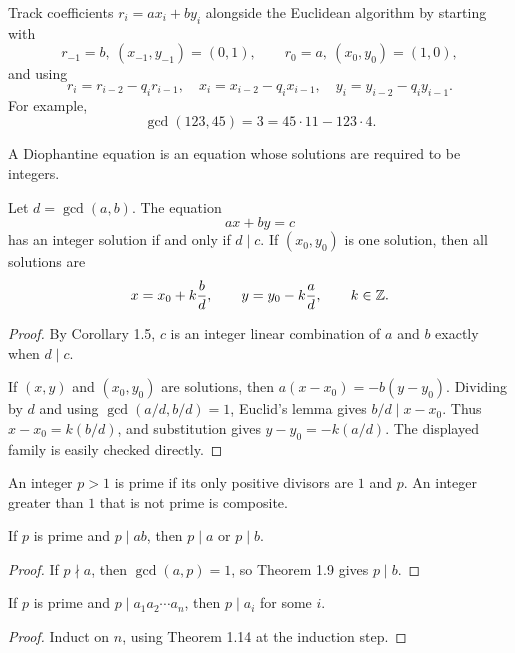 \begin{app}
Track coefficients $r_i=ax_i+by_i$ alongside the Euclidean algorithm by starting with
\[
 r_{-1}=b,\ (x_{-1},y_{-1})=(0,1),\qquad
 r_0=a,\ (x_0,y_0)=(1,0),
\]
and using
\[
 r_i=r_{i-2}-q_i r_{i-1},\quad
 x_i=x_{i-2}-q_i x_{i-1},\quad
 y_i=y_{i-2}-q_i y_{i-1}.
\]
For example,
\[
 \gcd(123,45)=3=45\cdot 11-123\cdot 4.
\]
\end{app}

\begin{de}
A Diophantine equation is an equation whose solutions are required to be integers.
\end{de}

\begin{thm}
Let $d=\gcd(a,b)$.  The equation
\[
 ax+by=c
\]
has an integer solution if and only if $d\mid c$.  If $(x_0,y_0)$ is one solution, then all solutions are
\[
 x=x_0+k\frac bd,\qquad y=y_0-k\frac ad,\qquad k\in\mathbb{Z}.
\]
\end{thm}
\begin{proof}
By Corollary 1.5, $c$ is an integer linear combination of $a$ and $b$ exactly when $d\mid c$.

If $(x,y)$ and $(x_0,y_0)$ are solutions, then
$a(x-x_0)=-b(y-y_0)$.  Dividing by $d$ and using
$\gcd(a/d,b/d)=1$, Euclid's lemma gives $b/d\mid x-x_0$.  Thus $x-x_0=k(b/d)$, and substitution gives $y-y_0=-k(a/d)$.  The displayed family is easily checked directly.
\end{proof}

\begin{de}
An integer $p>1$ is prime if its only positive divisors are $1$ and $p$.  An integer greater than $1$ that is not prime is composite.
\end{de}

\begin{thm}
If $p$ is prime and $p\mid ab$, then $p\mid a$ or $p\mid b$.
\end{thm}
\begin{proof}
If $p\nmid a$, then $\gcd(a,p)=1$, so Theorem 1.9 gives $p\mid b$.
\end{proof}

\begin{thm}
If $p$ is prime and $p\mid a_1a_2\cdots a_n$, then $p\mid a_i$ for some $i$.
\end{thm}
\begin{proof}
Induct on $n$, using Theorem 1.14 at the induction step.
\end{proof}

